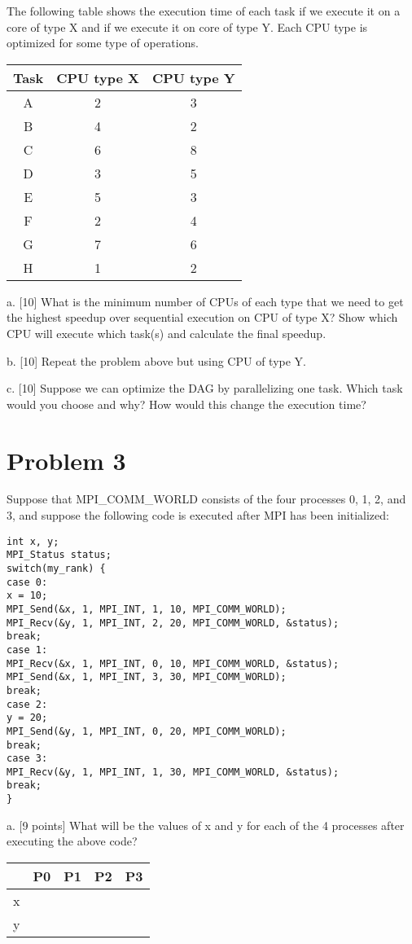 \documentclass{article}
\begin{document}
The following table shows the execution time of each task if we execute it on a core of type X and if we execute it on core of type Y.  Each CPU type is optimized for some type of operations.

\begin{tabular}{|c|c|c|}
\hline
Task & CPU type X & CPU type Y \\
\hline
A & 2 & 3 \\
B & 4 & 2 \\
C & 6 & 8 \\
D & 3 & 5 \\
E & 5 & 3 \\
F & 2 & 4 \\
G & 7 & 6 \\
H & 1 & 2 \\
\hline
\end{tabular}

a. [10] What is the minimum number of CPUs of each type that we need to get the highest speedup over sequential execution on CPU of type X? Show which CPU will execute which task(s) and calculate the final speedup.

b. [10] Repeat the problem above but using CPU of type Y.

c. [10]  Suppose we can optimize the DAG by parallelizing one task. Which task would you choose and why? How would this change the execution time?


\section*{Problem 3}
Suppose that MPI\_COMM\_WORLD consists of the four processes 0, 1, 2, and 3, and suppose the following code is executed after MPI has been initialized:

\begin{verbatim}
int x, y;
MPI_Status status;
switch(my_rank) {
case 0:
x = 10;
MPI_Send(&x, 1, MPI_INT, 1, 10, MPI_COMM_WORLD);
MPI_Recv(&y, 1, MPI_INT, 2, 20, MPI_COMM_WORLD, &status);
break;
case 1:
MPI_Recv(&x, 1, MPI_INT, 0, 10, MPI_COMM_WORLD, &status);
MPI_Send(&x, 1, MPI_INT, 3, 30, MPI_COMM_WORLD);
break;
case 2:
y = 20;
MPI_Send(&y, 1, MPI_INT, 0, 20, MPI_COMM_WORLD);
break;
case 3:
MPI_Recv(&y, 1, MPI_INT, 1, 30, MPI_COMM_WORLD, &status);
break;
}
\end{verbatim}

a. [9 points] What will be the values of x and y for each of the 4 processes after executing the above code?

\begin{tabular}{|c|c|c|c|c|}
\hline
 & P0 & P1 & P2 & P3 \\
\hline
x & & & & \\
y & & & & \\
\hline
\end{tabular}
\end{document}
